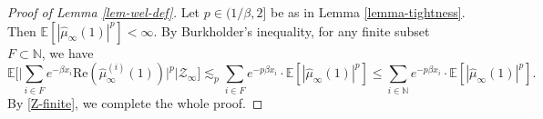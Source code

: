 \documentclass[12pt]{amsart}
\theoremstyle{definition}
\theoremstyle{remark}
\newcommand{\N}{\mathbb{N}}
\newcommand{\E}{\mathbb{E}}
\numberwithin{equation}{section}
\begin{document}
\begin{proof}[Proof of Lemma \ref{lem-wel-def}]
Let $p\in (1/\beta, 2]$ be as in Lemma \ref{lemma-tightness}. Then $\E[ |\widehat{\mu}_\infty(1)|^p] <\infty$.   By Burkholder's inequality, for any finite subset $F\subset \N$, we have 
\[
  \E \Big[ \Big|   \sum_{i \in F}  e^{-\beta x_i}   \mathrm{Re} (\widehat{\mu}^{(i)}_\infty(1)) \Big|^p  \Big| \mathcal{Z}_\infty\Big]   \lesssim_p     
    \sum_{i  \in F}  e^{- p \beta x_i}   \cdot  \E[ |\widehat{\mu}_\infty(1)|^p] \le  \sum_{i  \in \N}  e^{- p \beta x_i}   \cdot  \E[ |\widehat{\mu}_\infty(1)|^p]. 
\]
By \eqref{Z-finite}, we complete the whole proof. 
\end{proof}
\end{document}
